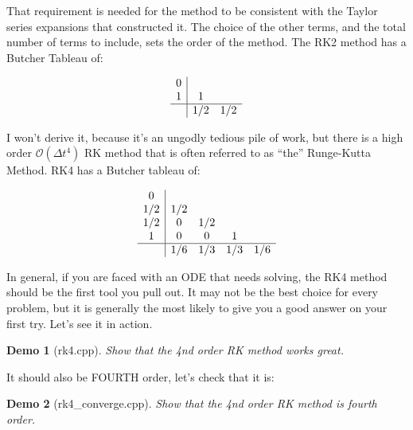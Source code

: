 \documentclass{article}
\theoremstyle{demo}
\newtheorem{demo}{Demo}[section]
\begin{document}
That requirement is needed for the method to be consistent with the Taylor
series expansions that constructed it.  The choice of the other terms, and the
total number of terms to include, sets the order of the method. The RK2 method
has a Butcher Tableau of:

\[
\begin{array}{c|cccc}
    0\\
    1 & 1 \\
    \hline
    & 1/2 & 1/2 
\end{array}
\]

I won't derive it, because it's an ungodly tedious pile of work, but there is a
high order $\mathcal{O}(\Delta t^4)$ RK method that is often referred to as
``the'' Runge-Kutta Method.  RK4 has a Butcher tableau of:

\[
\begin{array}{c|cccc}
    0\\
    1/2 & 1/2 \\
    1/2 & 0 & 1/2 \\
    1 & 0 & 0 & 1 \\
    \hline
    & 1/6 & 1/3 & 1/3 & 1/6
\end{array}
\]

In general, if you are faced with an ODE that needs solving, the RK4 method
should be the first tool you pull out.  It may not be the best choice for every
problem, but it is generally the most likely to give you a good answer on your
first try.  Let's see it in action.

\begin{demo}[rk4.cpp]
    Show that the 4nd order RK method works great.
\end{demo}

It should also be FOURTH order, let's check that it is:
\begin{demo}[rk4\_converge.cpp]
    Show that the 4nd order RK method is fourth order.
\end{demo}
\end{document}
